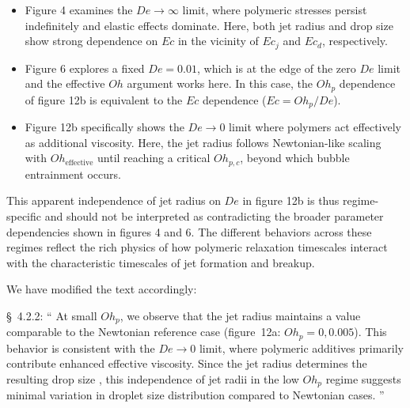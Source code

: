 \documentclass[]{article}
\newcommand{\vsy}[1]{\todo[color=orange, bordercolor=none, textcolor=white]{Vatsal}\textcolor{orange}{#1}}
\newcommand{\oo}{\color{magenta} \normalfont}
\newcommand{\bb}{\color{black} \normalfont}
\begin{document}
\begin{enumerate}
      \begin{itemize}
      	\item Figure 4 examines the $De \to \infty$ limit, where polymeric stresses persist indefinitely and elastic effects dominate. Here, both jet radius and drop size show strong dependence on $Ec$ in the vicinity of $Ec_j$ and $Ec_d$, respectively.
      	\item Figure 6 explores a fixed $De = 0.01$, which is at the edge of the zero $De$ limit and the effective $Oh$ argument works here. In this case, the $Oh_p$ dependence of figure 12b is equivalent to the $Ec$ dependence ($Ec = Oh_p/De$).
      	\item Figure 12b specifically shows the $De \to 0$ limit where polymers act effectively as additional viscosity. Here, the jet radius follows Newtonian-like scaling with $Oh_{\text{effective}}$ until reaching a critical $Oh_{p,c}$, beyond which bubble entrainment occurs.
      \end{itemize}

      This apparent independence of jet radius on $De$ in figure 12b is thus regime-specific and should not be interpreted as contradicting the broader parameter dependencies shown in figures 4 and 6. The different behaviors across these regimes reflect the rich physics of how polymeric relaxation timescales interact with the characteristic timescales of jet formation and breakup.

      We have modified the text accordingly:

      \S~4.2.2: ``\oo At small $Oh_p$, we observe that the jet radius maintains a value comparable to the Newtonian reference case (figure~12a: $Oh_p = 0, 0.005$). This behavior is consistent with the $De \to 0$ limit, where polymeric additives primarily contribute enhanced effective viscosity. Since the jet radius determines the resulting drop size \citep{ganan2017revision,blanco2020sea}, this independence of jet radii in the low $Oh_p$ regime suggests minimal variation in droplet size distribution compared to Newtonian cases.\bb''



 \end{enumerate}

\printbibliography
\end{document}
